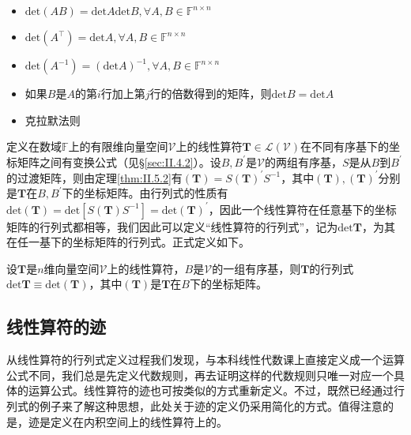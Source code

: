 \documentclass[main.tex]{subfiles}
\begin{document}
\begin{theorem}
\quad
\begin{itemize}
    \item $\mathrm{det}\left(AB\right)=\mathrm{det}A\mathrm{det}B,\forall A,B\in\mathbb{F}^{n\times n}$
    \item $\mathrm{det}\left(A^\intercal\right)=\mathrm{det}A,\forall A,B\in\mathbb{F}^{n\times n}$
    \item $\mathrm{det}\left(A^{-1}\right)=\left(\mathrm{det}A\right)^{-1},\forall A,B\in\mathbb{F}^{n\times n}$
    \item 如果$B$是$A$的第$i$行加上第$j$行的倍数得到的矩阵，则$\mathrm{det}B=\mathrm{det}A$
    \item 克拉默法则\cite[\S1.5,p.~15]{周胜林2012线性代数}
\end{itemize}
\end{theorem}

定义在数域$\mathbb{F}$上的有限维向量空间$\mathcal{V}$上的线性算符$\mathbf{T}\in\mathcal{L}\left(\mathcal{V}\right)$在不同有序基下的坐标矩阵之间有变换公式（见\S\ref{sec:II.4.2}）。设$B,B^\prime$是$\mathcal{V}$的两组有序基，$S$是从$B$到$B^\prime$的过渡矩阵，则由定理\ref{thm:II.5.2}有$\left(\mathbf{T}\right)=S\left(\mathbf{T}\right)^\prime S^{-1}$，其中$\left(\mathbf{T}\right),\left(\mathbf{T}\right)^\prime$分别是$\mathbf{T}$在$B,B^\prime$下的坐标矩阵。由行列式的性质有$\mathrm{det}\left(\mathbf{T}\right)=\mathrm{det}\left[S\left(\mathbf{T}\right)S^{-1}\right]=\mathrm{det}\left(\mathbf{T}\right)^\prime$，因此一个线性算符在任意基下的坐标矩阵的行列式都相等，我们因此可以定义“线性算符的行列式”，记为$\mathrm{det}\mathbf{T}$，为其在任一基下的坐标矩阵的行列式。正式定义如下。

\begin{definition}[线性算符的行列式]
设$\mathbf{T}$是$n$维向量空间$\mathcal{V}$上的线性算符，$B$是$\mathcal{V}$的一组有序基，则$\mathbf{T}$的行列式$\mathrm{det}\mathbf{T}\equiv\mathrm{det}\left(\mathbf{T}\right)$，其中$\left(\mathbf{T}\right)$是$\mathbf{T}$在$B$下的坐标矩阵。
\end{definition}

\subsection{线性算符的迹}
从线性算符的行列式定义过程我们发现，与本科线性代数课上直接定义成一个运算公式不同，我们总是先定义代数规则，再去证明这样的代数规则只唯一对应一个具体的运算公式。线性算符的迹也可按类似的方式重新定义。不过，既然已经通过行列式的例子来了解这种思想，此处关于迹的定义仍采用简化的方式。值得注意的是，迹是定义在内积空间上的线性算符上的。
\end{document}
